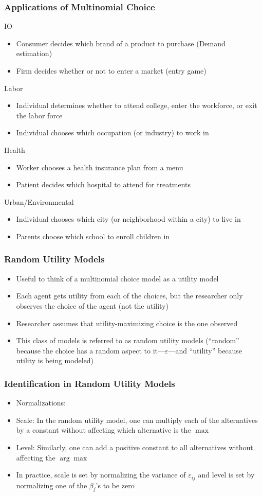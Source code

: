 \documentclass[english,xcolor=dvipsnames]{beamer}
\newcommand{\bi}{\begin{itemize}}
\newcommand{\ei}{\end{itemize}}
\begin{document}
\begin{frame}
\frametitle{Applications of Multinomial Choice}
IO
      \bi 
      \item Consumer decides which brand of a product to purchase (Demand estimation)
      \item Firm decides whether or not to enter a market (entry game)
      \ei
Labor
      \bi 
      \item Individual determines whether to attend college, enter the workforce, or exit the labor force
      \item Individual chooses which occupation (or industry) to work in
      \ei
Health
      \bi 
      \item Worker chooses a health insurance plan from a menu
      \item Patient decides which hospital to attend for treatments
      \ei
Urban/Environmental
      \bi 
      \item Individual chooses which city (or neighborhood within a city) to live in
      \item Parents choose which school to enroll children in
      \ei
\end{frame}

\begin{frame}
\frametitle{Random Utility Models}
   \bi 
   \item Useful to think of a multinomial choice model as a utility model
   \item Each agent gets utility from each of the choices, but the researcher only observes the choice of the agent (not the utility)
   \item Researcher assumes that utility-maximizing choice is the one observed
   \item This class of models is referred to as random utility models (``random'' because the choice has a random aspect to it---$\varepsilon$---and ``utility'' because utility is being modeled)
   \ei
\end{frame}

\begin{frame}
\frametitle{Identification in Random Utility Models}
   \bi 
   \item Normalizations:
   \item Scale: In the random utility model, one can multiply each of the alternatives by a constant without affecting which alternative is the $\max$
   \item Level: Similarly, one can add a positive constant to all alternatives without affecting the $\arg \max$
   \item In practice, scale is set by normalizing the variance of $\varepsilon_{ij}$ and level is set by normalizing one of the $\beta_{j}$'s to be zero
   \ei
\end{frame}
\end{document}
